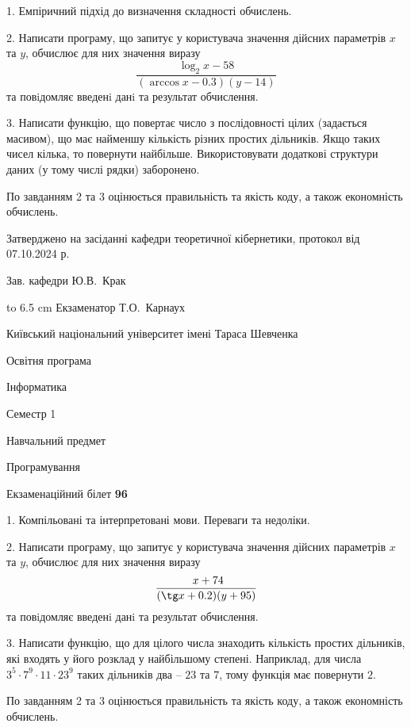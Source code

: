 \documentclass[12pt, ukrainian]{article}
\begin{document}
{%
1. Емпіричний підхід до визначення складності обчислень.%
\par
2. Написати програму, що запитує у користувача значення дійсних параметрів $x$ та $y$, обчислює для них значення виразу 
$$\frac{\log_{2} x - 58}{(\arccos x - 0.3) (y - 14)}$$ 
та повiдомляє введенi данi та результат обчислення.

\par
3. Написати функцію, що повертає число з послідовності цілих (задається масивом), що має найменшу кількість різних простих дільників. Якщо таких чисел кілька, то повернути найбільше. Використовувати додаткові структури даних (у тому числі рядки) заборонено.

По завданням 2 та 3 оцінюється правильність та якість коду, а також економність обчислень.

}
{\smallskip\smallskip \begin {scriptsize} Затверджено на засіданні кафедри теоретичної кібернетики, протокол   від   07.10.2024 р.\par\smallskip\smallskip\smallskip\smallskip
{\parbox {6.5 cm} {Зав. кафедри \dotfill Ю.В.~Крак}}\hspace {0.7cm} {\hbox to 6.5 cm { Екзаменатор \dotfill Т.О.~Карнаух}} \end{scriptsize}}
\vspace{0.9cm}
{{\begin {scriptsize}\par
{ \center  Київський національний університет імені Тараса Шевченка \par}
{\parbox {5 cm}{Освітня програма \hfill}{\parbox {7 cm}{Інформатика\hfill}}\parbox {6 cm}{\hfill Семестр 1}}\par
{\parbox {5 cm} {Навчальний предмет \hfill}\parbox {7 cm}{Програмування \hfill}\parbox {6cm}{\hfill}\par}\vspace{-15pt} \end{scriptsize}}{\center Екзаменаційний білет \No \textbf { 96 }\par}}
{%
1. Компільовані та інтерпретовані мови. Переваги та недоліки.%
\par
2. Написати програму, що запитує у користувача значення дійсних параметрів $x$ та $y$, обчислює для них значення виразу 
$$\frac{\ x + 74}{(\tg x + 0.2) (y + 95)}$$ 
та повiдомляє введенi данi та результат обчислення.

\par
3. Написати функцію, що для цілого числа знаходить кількість простих дільників, які входять у його розклад у найбільшому степені. Наприклад, для числа $3^5{\cdot}7^9{\cdot}11{\cdot}23^{9}$ таких дільників два – $23$ та $7$, тому функція має повернути $2$.

По завданням 2 та 3 оцінюється правильність та якість коду, а також економність обчислень.

}
\end{document}
